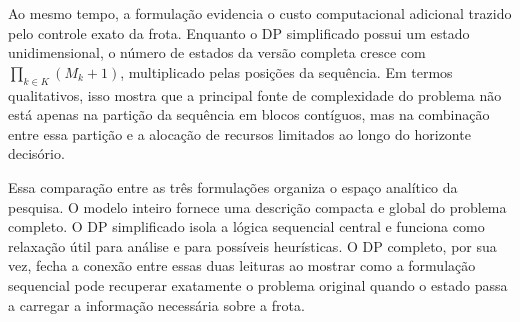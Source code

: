 Ao mesmo tempo, a formulação evidencia o custo computacional adicional trazido
pelo controle exato da frota. Enquanto o DP simplificado possui um estado
unidimensional, o número de estados da versão completa cresce com
\(\prod_{k \in K} (M_k + 1)\), multiplicado pelas posições da sequência. Em
termos qualitativos, isso mostra que a principal fonte de complexidade do
problema não está apenas na partição da sequência em blocos contíguos, mas na
combinação entre essa partição e a alocação de recursos limitados ao longo do
horizonte decisório.

Essa comparação entre as três formulações organiza o espaço analítico da
pesquisa. O modelo inteiro fornece uma descrição compacta e global do problema
completo. O DP simplificado isola a lógica sequencial central e funciona como
relaxação útil para análise e para possíveis heurísticas. O DP completo, por sua
vez, fecha a conexão entre essas duas leituras ao mostrar como a formulação
sequencial pode recuperar exatamente o problema original quando o estado passa a
carregar a informação necessária sobre a frota.
